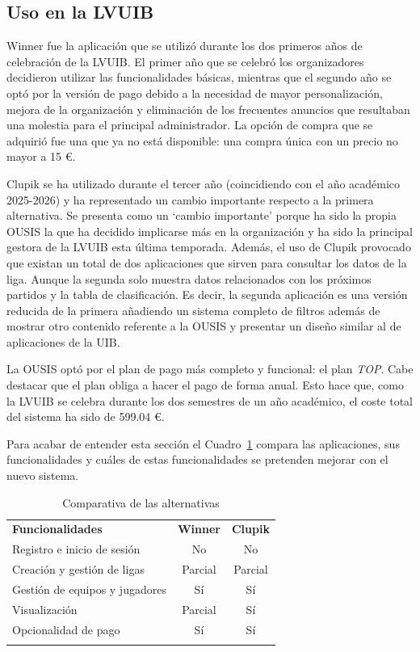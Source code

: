 \subsection*{Uso en la LVUIB}

Winner fue la aplicación que se utilizó durante los dos primeros años de celebración de la \ac{LVUIB}. El primer año que se celebró los organizadores decidieron utilizar las funcionalidades básicas, mientras que el segundo año se optó por la versión de pago debido a la necesidad de mayor personalización, mejora de la organización y eliminación de los frecuentes anuncios que resultaban una molestia para el principal administrador. La opción de compra que se adquirió fue una que ya no está disponible: una compra única con un precio no mayor a 15 €.

Clupik se ha utilizado durante el tercer año (coincidiendo con el año académico 2025-2026) y ha representado un cambio importante respecto a la primera alternativa. Se presenta como un `cambio importante' porque ha sido la propia \ac{OUSIS} la que ha decidido implicarse más en la organización y ha sido la principal gestora de la \ac{LVUIB} esta última temporada. Además, el uso de Clupik provocado que existan un total de dos aplicaciones que sirven para consultar los datos de la liga. Aunque la segunda solo muestra datos relacionados con los próximos partidos y la tabla de clasificación. Es decir, la segunda aplicación es una versión reducida de la primera añadiendo un sistema completo de filtros además de mostrar otro contenido referente a la \ac{OUSIS} y presentar un diseño similar al de aplicaciones de la \ac{UIB}.

La \ac{OUSIS} optó por el plan de pago más completo y funcional: el plan \emph{TOP}. Cabe destacar que el plan obliga a hacer el pago de forma anual. Esto hace que, como la \ac{LVUIB} se celebra durante los dos semestres de un año académico, el coste total del sistema ha sido de 599.04 €.

Para acabar de entender esta sección el Cuadro~\ref{tab:compare_alternatives} compara las aplicaciones, sus funcionalidades y cuáles de estas funcionalidades se pretenden mejorar con el nuevo sistema.

\begin{table}[H]
    \centering
    \renewcommand{\arraystretch}{1.25}
    \begin{tabularx}{\textwidth}{>{\RaggedRight\arraybackslash}X c c}
        \textbf{Funcionalidades} & \textbf{Winner} & \textbf{Clupik} \\ \lightrule
        Registro e inicio de sesión & No & No \\ \lightrule
        Creación y gestión de ligas & Parcial & Parcial \\ \lightrule
        Gestión de equipos y jugadores & Sí & Sí \\ \lightrule
        Visualización & Parcial & Sí \\ \lightrule
        Opcionalidad de pago & Sí & Sí \\ \lightrule
    \end{tabularx}
    \caption{Comparativa de las alternativas}
    \label{tab:compare_alternatives}
\end{table}

